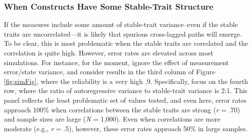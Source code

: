 \documentclass[
  english,
  man,floatsintext]{apa6}
\begin{document}
\hypertarget{when-constructs-have-some-stable-trait-structure}{%
\subsubsection{When Constructs Have Some Stable-Trait Structure}\label{when-constructs-have-some-stable-trait-structure}}

If the measures include some amount of stable-trait variance--even if the stable traits are uncorrelated---it is likely that spurious cross-lagged paths will emerge. To be clear, this is most problematic when the stable traits are correlated and the correlation is quite high. However, error rates are elevated across most simulations. For instance, for the moment, ignore the effect of measurement error/state variance, and consider results in the third column of Figure \ref{fig:simFig}, where the reliability is a very high .9. Specifically, focus on the fourth row, where the ratio of autoregressive variance to stable-trait variance is 2:1. This panel reflects the least problematic set of values tested, and even here, error rates approach 100\% when correlations between the stable traits are strong (\emph{r} = .70) and sample sizes are large (\emph{N} = 1,000). Even when correlations are more moderate (e.g., \emph{r} = .5), however, these error rates approach 50\% in large samples.
\end{document}
